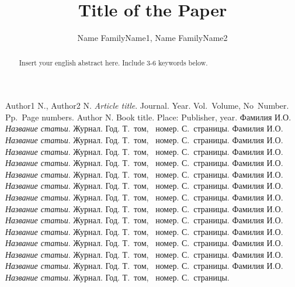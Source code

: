 \documentclass[12pt]{llncs}
\begin{document}
\begin{thebibliography}{99}
Author1 N., Author2 N.  {\it Article title}. Journal. Year. Vol.~Volume, No~Number. Pp.~Page numbers.
Author N. Book title. Place: Publisher, year.
 Фамилия И.О. {\it Название статьи}. Журнал. Год. Т.~том,  \textnumero~номер. С.~страницы.
 Фамилия И.О. {\it Название статьи}. Журнал. Год. Т.~том,  \textnumero~номер. С.~страницы.
 Фамилия И.О. {\it Название статьи}. Журнал. Год. Т.~том,  \textnumero~номер. С.~страницы.
 Фамилия И.О. {\it Название статьи}. Журнал. Год. Т.~том,  \textnumero~номер. С.~страницы.
 Фамилия И.О. {\it Название статьи}. Журнал. Год. Т.~том,  \textnumero~номер. С.~страницы.
 Фамилия И.О. {\it Название статьи}. Журнал. Год. Т.~том,  \textnumero~номер. С.~страницы.
 Фамилия И.О. {\it Название статьи}. Журнал. Год. Т.~том,  \textnumero~номер. С.~страницы.
 Фамилия И.О. {\it Название статьи}. Журнал. Год. Т.~том,  \textnumero~номер. С.~страницы.
 Фамилия И.О. {\it Название статьи}. Журнал. Год. Т.~том,  \textnumero~номер. С.~страницы.
 Фамилия И.О. {\it Название статьи}. Журнал. Год. Т.~том,  \textnumero~номер. С.~страницы.
 Фамилия И.О. {\it Название статьи}. Журнал. Год. Т.~том,  \textnumero~номер. С.~страницы.
 Фамилия И.О. {\it Название статьи}. Журнал. Год. Т.~том,  \textnumero~номер. С.~страницы.
 Фамилия И.О. {\it Название статьи}. Журнал. Год. Т.~том,  \textnumero~номер. С.~страницы.
 Фамилия И.О. {\it Название статьи}. Журнал. Год. Т.~том,  \textnumero~номер. С.~страницы.
\end{thebibliography}



\begin{englishtitle}
\title{Title of the Paper}
\author{Name FamilyName1,
Name FamilyName2}

\maketitle

\begin{abstract}
Insert your english abstract here. Include 3-6 keywords below.

\end{abstract}
\end{englishtitle}
\end{document}
